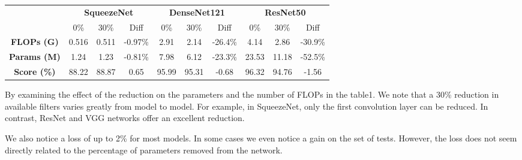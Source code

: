 \documentclass[12pt]{article}
\begin{document}
\begin{table}[H]
\begin{tabular}{cccccccccc}
		& \multicolumn{3}{c}{\textbf{SqueezeNet}}                                                                     & \multicolumn{3}{c}{\textbf{DenseNet121}}                                                                    & \multicolumn{3}{c}{\textbf{ResNet50}}                                                                      \\
		& 0\%                       & 30\%                      & Diff                                                & 0\%                       & 30\%                      & Diff                                                & 0\%                       & 30\%                      & Diff                                               \\ \cline{2-10} 
		\multicolumn{1}{c|}{\textbf{FLOPs (G)}}  & 0.516                     & 0.511                     & \multicolumn{1}{c|}{{\color[HTML]{009901} -0.97\%}} & 2.91                      & 2.14                      & \multicolumn{1}{c|}{{\color[HTML]{009901} -26.4\%}} & 4.14                      & 2.86                      & {\color[HTML]{009901} -30.9\%}                     \\
		\multicolumn{1}{c|}{\textbf{Params (M)}} & 1.24                      & 1.23                      & \multicolumn{1}{c|}{{\color[HTML]{009901} -0.81\%}} & 7.98                      & 6.12                      & \multicolumn{1}{c|}{{\color[HTML]{009901} -23.3\%}} & 23.53                     & 11.18                     & {\color[HTML]{009901} -52.5\%}                     \\
		\multicolumn{1}{c|}{\textbf{Score (\%)}} & 88.22                     & 88.87                     & \multicolumn{1}{c|}{{\color[HTML]{009901} 0.65}}    & 95.99                     & 95.31                     & \multicolumn{1}{c|}{{\color[HTML]{9A0000} -0.68}}   & 96.32                     & 94.76                     & {\color[HTML]{9A0000} -1.56}                      
	\end{tabular}
\end{table}

By examining the effect of the reduction on the parameters and the number of FLOPs in the table1. We note that a 30\% reduction in available filters varies greatly from model to model. For example, in SqueezeNet, only the first convolution layer can be reduced. In contrast, ResNet and VGG networks offer an excellent reduction.


We also notice a loss of up to 2\% for most models. In some cases we even notice a gain on the set of tests. However, the loss does not seem directly related to the percentage of parameters removed from the network.
\end{document}
